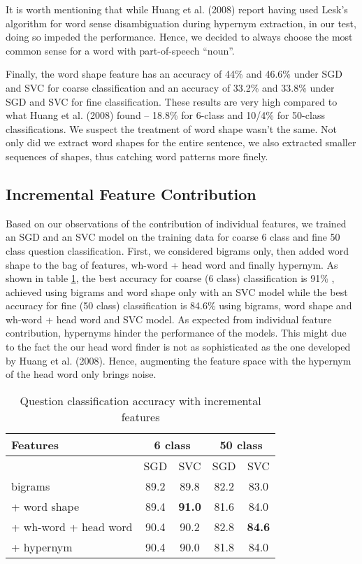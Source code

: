 \documentclass[11pt]{article}
\begin{document}
It is worth mentioning that while Huang et al. (2008) report having used Lesk's algorithm for word sense disambiguation during hypernym extraction, in our test, doing so impeded the performance. Hence, we decided to always choose the most common sense for a word with part-of-speech ``noun''.

Finally, the word shape feature has an accuracy of 44\% and 46.6\% under SGD and SVC for coarse classification and an accuracy of 33.2\% and 33.8\% under SGD and SVC for fine classification. These results are very high compared to what Huang et al. (2008) found -- 18.8\% for 6-class and 10/4\% for 50-class classifications. We suspect the treatment of word shape wasn't the same. Not only did we extract word shapes for the entire sentence, we also extracted smaller sequences of shapes, thus catching word patterns more finely.

\subsection{Incremental Feature Contribution}

Based on our observations of the contribution of individual features, we trained an SGD and an SVC model on the training data for coarse 6 class and fine 50 class question classification. First, we considered bigrams only, then added word shape to the bag of features, wh-word + head word and finally hypernym. As shown in table \ref{incremental}, the best accuracy for coarse (6 class) classification is 91\% , achieved using bigrams and word shape only with an SVC model while the best accuracy for fine (50 class) classification is 84.6\% using bigrams, word shape and wh-word + head word and SVC model. As expected from individual feature contribution, hypernyms hinder the performance of the models. This might due to the fact the our head word finder is not as sophisticated as the one developed by Huang et al. (2008). Hence, augmenting the feature space with the hypernym of the head word only brings noise.

\begin{table}[ht]
\begin{center}
\small
\begin{tabular}{l | c | c | c | c}
\hline
Features & \multicolumn{2}{c|}{6 class} & \multicolumn{2}{c}{50 class} \\
\hline
 & SGD & SVC	& SGD & SVC \\
\hline
bigrams & 89.2 & 89.8 &  82.2 &  83.0 \\
\hline
+ word shape & 89.4 & \textbf{91.0} & 81.6 & 84.0 \\
+ wh-word + head word & 90.4 & 90.2 & 82.8 & \textbf{84.6} \\
+ hypernym & 90.4 & 90.0 & 81.8  & 84.0 \\
\hline
\end{tabular}
\end{center}
\caption{\label{incremental}{Question classification accuracy with incremental features}}
\end{table}
\end{document}
